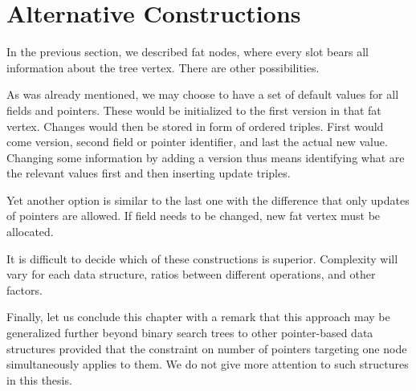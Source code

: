 
\section{Alternative Constructions}

In the previous section, we described fat nodes, where every slot bears all information about the tree vertex. There are other possibilities.

As was already mentioned, we may choose to have a set of default values for all fields and pointers.
These would be initialized to the first version in that fat vertex. Changes would then be stored in form of ordered triples. First would come version, second field or pointer identifier, and last the actual new value. Changing some information by adding a version thus means identifying what are the relevant values first and then inserting update triples.

Yet another option is similar to the last one with the difference that only updates of pointers are allowed. If field needs to be changed, new fat vertex must be allocated.

It is difficult to decide which of these constructions is superior. Complexity will vary for each data structure, ratios between different operations, and other factors.

Finally, let us conclude this chapter with a remark that this approach may be generalized further beyond binary search trees to other pointer-based data structures provided that the constraint on number of pointers targeting one node simultaneously applies to them.
We do not give more attention to such structures in this thesis.
